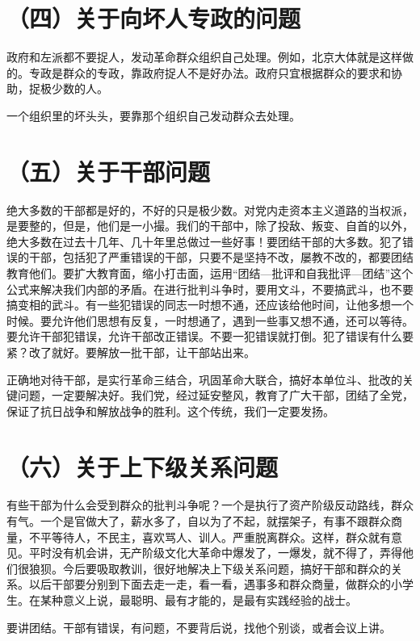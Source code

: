 \section{（四）关于向坏人专政的问题}

政府和左派都不要捉人，发动革命群众组织自己处理。例如，北京大体就是这样做的。专政是群众的专政，靠政府捉人不是好办法。政府只宜根据群众的要求和协助，捉极少数的人。

一个组织里的坏头头，要靠那个组织自己发动群众去处理。

\section{（五）关于干部问题}

绝大多数的干部都是好的，不好的只是极少数。对党内走资本主义道路的当权派，是要整的，但是，他们是一小撮。我们的干部中，除了投敌、叛变、自首的以外，绝大多数在过去十几年、几十年里总做过一些好事！要团结干部的大多数。犯了错误的干部，包括犯了严重错误的干部，只要不是坚持不改，屡教不改的，都要团结教育他们。要扩大教育面，缩小打击面，运用“团结—批评和自我批评—团结”这个公式来解决我们内部的矛盾。在进行批判斗争时，要用文斗，不要搞武斗，也不要搞变相的武斗。有一些犯错误的同志一时想不通，还应该给他时间，让他多想一个时候。要允许他们思想有反复，一时想通了，遇到一些事又想不通，还可以等待。要允许干部犯错误，允许干部改正错误。不要一犯错误就打倒。犯了错误有什么要紧？改了就好。要解放一批干部，让干部站出来。

正确地对待干部，是实行革命三结合，巩固革命大联合，搞好本单位斗、批改的关键问题，一定要解决好。我们党，经过延安整风，教育了广大干部，团结了全党，保证了抗日战争和解放战争的胜利。这个传统，我们一定要发扬。

\section{（六）关于上下级关系问题}

有些干部为什么会受到群众的批判斗争呢？一个是执行了资产阶级反动路线，群众有气。一个是官做大了，薪水多了，自以为了不起，就摆架子，有事不跟群众商量，不平等待人，不民主，喜欢骂人、训人。严重脱离群众。这样，群众就有意见。平时没有机会讲，无产阶级文化大革命中爆发了，一爆发，就不得了，弄得他们很狼狈。今后要吸取教训，很好地解决上下级关系问题，搞好干部和群众的关系。以后干部要分别到下面去走一走，看一看，遇事多和群众商量，做群众的小学生。在某种意义上说，最聪明、最有才能的，是最有实践经验的战士。

要讲团结。干部有错误，有问题，不要背后说，找他个别谈，或者会议上讲。


